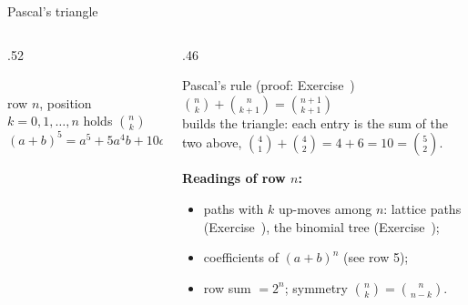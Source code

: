 \documentclass[aspectratio=169,11pt,usepdftitle=false]{beamer}
\begin{document}
\begin{frame}[t]{Pascal's triangle}
  \begin{columns}[T]
    \begin{column}{.52\textwidth}
      \centering
      \\[1mm]
      \footnotesize row $n$, position $k=0,1,\dots,n$ holds $\binom nk$\\[3mm]
      \small $(a+b)^5=a^5+5a^4b+10a^3b^2+10a^2b^3+5ab^4+b^5$
    \end{column}
    \begin{column}{.46\textwidth}
      \small
      \begin{block}{Pascal's rule (proof: Exercise~)}
        $\displaystyle\binom nk+\binom n{k+1}=\binom{n+1}{k+1}$\\[1mm]
        builds the triangle: each entry is the sum of the two above,
        $\binom41+\binom42=4+6=10=\binom52$.
      \end{block}
      \textbf{Readings of row $n$:}
      \begin{itemize}
        \item paths with $k$ up-moves among $n$: lattice paths
              (Exercise~), the binomial tree
              (Exercise~);
        \item coefficients of $(a+b)^n$ (see row 5);
        \item row sum $=2^n$; symmetry $\binom nk=\binom n{n-k}$.
      \end{itemize}
    \end{column}
  \end{columns}
\end{frame}
\end{document}
